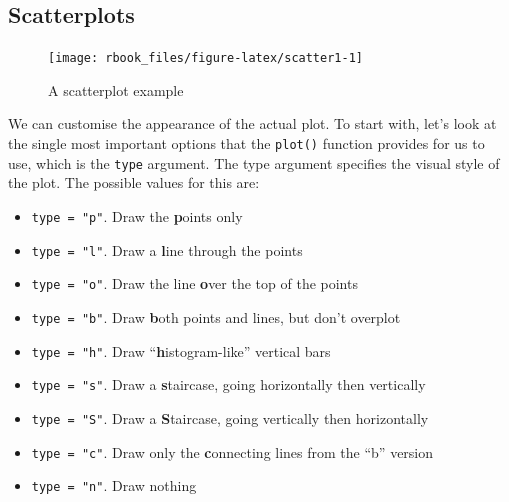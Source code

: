 \documentclass[]{book}
\newenvironment{Shaded}{\begin{snugshade}}{\end{snugshade}}
\newcommand{\DataTypeTok}[1]{\textcolor[rgb]{0.13,0.29,0.53}{#1}}
\newcommand{\KeywordTok}[1]{\textcolor[rgb]{0.13,0.29,0.53}{\textbf{#1}}}
\newcommand{\NormalTok}[1]{#1}
\newcommand{\OperatorTok}[1]{\textcolor[rgb]{0.81,0.36,0.00}{\textbf{#1}}}
\newcommand{\StringTok}[1]{\textcolor[rgb]{0.31,0.60,0.02}{#1}}
\providecommand{\tightlist}{%
  \setlength{\itemsep}{0pt}\setlength{\parskip}{0pt}}
\begin{document}
\hypertarget{scatterplots}{%
\subsection{Scatterplots}\label{scatterplots}}

\begin{Shaded}
\end{Shaded}

\begin{figure}

{\centering \texttt{[image: rbook\_files/figure-latex/scatter1-1]} 

}

\caption{A scatterplot example}\label{fig:scatter1}
\end{figure}

We can customise the appearance of the actual plot. To start with, let's look at the single most important options that the \texttt{plot()} function provides for us to use, which is the \texttt{type} argument. The type argument specifies the visual style of the plot. The possible values for this are:

\begin{itemize}
\tightlist
\item
  \texttt{type\ =\ "p"}. Draw the \textbf{p}oints only
\item
  \texttt{type\ =\ "l"}. Draw a \textbf{l}ine through the points
\item
  \texttt{type\ =\ "o"}. Draw the line \textbf{o}ver the top of the points
\item
  \texttt{type\ =\ "b"}. Draw \textbf{b}oth points and lines, but don't overplot
\item
  \texttt{type\ =\ "h"}. Draw ``\textbf{h}istogram-like'' vertical bars
\item
  \texttt{type\ =\ "s"}. Draw a \textbf{s}taircase, going horizontally then vertically
\item
  \texttt{type\ =\ "S"}. Draw a \textbf{S}taircase, going vertically then horizontally
\item
  \texttt{type\ =\ "c"}. Draw only the \textbf{c}onnecting lines from the ``b'' version
\item
  \texttt{type\ =\ "n"}. Draw nothing
\end{itemize}
\end{document}
